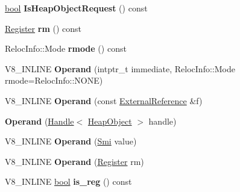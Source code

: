 \begin{DoxyCompactItemize}
\mbox{\hyperlink{classbool}{bool}} {\bfseries Is\+Heap\+Object\+Request} () const
\item 
\mbox{\label{classv8_1_1internal_1_1Operand_ad0495c31017fd74b04574225b3af4d39}} 
\mbox{\hyperlink{classv8_1_1internal_1_1Register}{Register}} {\bfseries rm} () const
\item 
\mbox{\label{classv8_1_1internal_1_1Operand_a426ed4df4a3c04c315a06be3fe26fc3a}} 
Reloc\+Info\+::\+Mode {\bfseries rmode} () const
\item 
\mbox{\label{classv8_1_1internal_1_1Operand_a06953845aca3ef2752a5700b0dc82efb}} 
V8\+\_\+\+I\+N\+L\+I\+NE {\bfseries Operand} (intptr\+\_\+t immediate, Reloc\+Info\+::\+Mode rmode=Reloc\+Info\+::\+N\+O\+NE)
\item 
\mbox{\label{classv8_1_1internal_1_1Operand_a538d1dcaf002542b9144b5fbc062d728}} 
V8\+\_\+\+I\+N\+L\+I\+NE {\bfseries Operand} (const \mbox{\hyperlink{classv8_1_1internal_1_1ExternalReference}{External\+Reference}} \&f)
\item 
\mbox{\label{classv8_1_1internal_1_1Operand_a89275469683feb79dbec2790f984cf2d}} 
{\bfseries Operand} (\mbox{\hyperlink{classv8_1_1internal_1_1Handle}{Handle}}$<$ \mbox{\hyperlink{classv8_1_1internal_1_1HeapObject}{Heap\+Object}} $>$ handle)
\item 
\mbox{\label{classv8_1_1internal_1_1Operand_a027e7cab65c73c00b2ef5381724dd3be}} 
V8\+\_\+\+I\+N\+L\+I\+NE {\bfseries Operand} (\mbox{\hyperlink{classv8_1_1internal_1_1Smi}{Smi}} value)
\item 
\mbox{\label{classv8_1_1internal_1_1Operand_afa91505837ddc2da0a1e92af8b54b097}} 
V8\+\_\+\+I\+N\+L\+I\+NE {\bfseries Operand} (\mbox{\hyperlink{classv8_1_1internal_1_1Register}{Register}} rm)
\item 
\mbox{\label{classv8_1_1internal_1_1Operand_ac595e80d0e3d2f2033227a0b58795587}} 
V8\+\_\+\+I\+N\+L\+I\+NE \mbox{\hyperlink{classbool}{bool}} {\bfseries is\+\_\+reg} () const
\item 

\end{DoxyCompactItemize}
